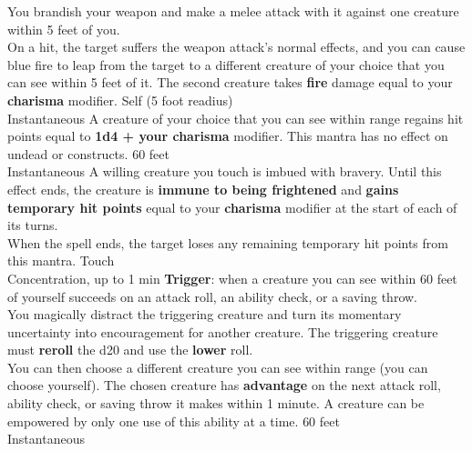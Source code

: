 \documentclass{article}
\begin{document}
\begin{center}
    {You brandish your weapon and make a melee attack with it against one creature within 5 feet of you.
    \\[1mm]
    On a hit, the target suffers the weapon attack’s normal effects, and you can cause blue fire to leap from the target to a different creature of your choice that you can see within 5 feet of it. The second creature takes \textbf{fire} damage equal to your \textbf{charisma} modifier.}
    {Self (5 foot readius)\\Instantaneous}%
    {A creature of your choice that you can see within range regains hit points equal to \textbf{1d4 + your charisma} modifier. This mantra has no effect on undead or constructs.}
    {60 feet\\Instantaneous}%
    {A willing creature you touch is imbued with bravery. Until this effect ends, the creature is \textbf{immune to being frightened} and \textbf{gains temporary hit points} equal to your \textbf{charisma} modifier at the start of each of its turns.
    \\[1mm]
    When the spell ends, the target loses any remaining temporary hit points from this mantra.}
    {Touch\\Concentration, up to 1 min}%
    {\textbf{Trigger}: when a creature you can see within 60 feet of yourself succeeds on an attack roll, an ability check, or a saving throw.
    \\[1mm]
    You magically distract the triggering creature and turn its momentary uncertainty into encouragement for another creature. The triggering creature must \textbf{reroll} the d20 and use the \textbf{lower} roll.
    \\[1mm]
    You can then choose a different creature you can see within range (you can choose yourself). The chosen creature has \textbf{advantage} on the next attack roll, ability check, or saving throw it makes within 1 minute. A creature can be empowered by only one use of this ability at a time.}
    {60 feet\\Instantaneous}%

\end{center}
\end{document}
